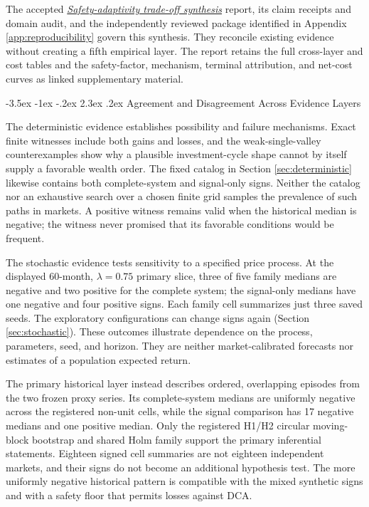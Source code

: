\documentclass[12pt,a4paper,oneside]{report}
\makeatletter
\renewcommand\section{\@startsection{section}{1}{\z@}%
  {-3.5ex \@plus -1ex \@minus -.2ex}%
  {2.3ex \@plus .2ex}%
  {\normalfont\fontsize{14}{17}\selectfont\bfseries}}
\makeatother
\begin{document}
The accepted \href{https://github.com/razvan-tanase/SmartDCA-Research/blob/07935797850387e786e396de6f5aa839cf8a26e4/reports/experiments/safety-adaptivity-tradeoff-synthesis.md}{\emph{Safety-adaptivity trade-off synthesis}} report, its claim
receipts and domain audit, and the independently reviewed package identified
in Appendix \ref{app:reproducibility} govern this synthesis. They reconcile
existing evidence without creating a fifth empirical layer. The report retains
the full cross-layer and cost tables and the safety-factor, mechanism, terminal
attribution, and net-cost curves as linked supplementary material.

\section{Agreement and Disagreement Across Evidence Layers}
\label{sec:discussion-evidence-layers}

The deterministic evidence establishes possibility and failure mechanisms.
Exact finite witnesses include both gains and losses, and the weak-single-valley
counterexamples show why a plausible investment-cycle shape cannot by itself
supply a favorable wealth order. The fixed catalog in Section
\ref{sec:deterministic} likewise contains both complete-system and signal-only
signs. Neither the catalog nor an exhaustive search over a chosen finite grid
samples the prevalence of such paths in markets. A positive witness remains
valid when the historical median is negative; the witness never promised that
its favorable conditions would be frequent.

The stochastic evidence tests sensitivity to a specified price process. At the displayed 60-month, $\lambda=0.75$
primary slice, three of five family medians are negative and two positive for
the complete system; the signal-only medians have one negative and four
positive signs. Each family cell summarizes just three saved seeds. The
exploratory configurations can change signs again (Section
\ref{sec:stochastic}). These outcomes illustrate dependence on the process,
parameters, seed, and horizon. They are neither market-calibrated forecasts nor
estimates of a population expected return.

The primary historical layer instead describes ordered, overlapping episodes
from the two frozen proxy series. Its complete-system medians are uniformly
negative across the registered non-unit cells, while the signal comparison has
17 negative medians and one positive median. Only the registered H1/H2
circular moving-block bootstrap and shared Holm family support the primary
inferential statements. Eighteen signed cell summaries are not eighteen
independent markets, and their signs do not become an additional hypothesis
test. The more uniformly negative historical pattern is compatible with the
mixed synthetic signs and with a safety floor that permits losses against DCA.
\end{document}
